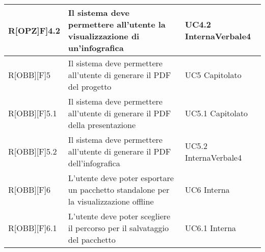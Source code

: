 \begin{table}[H]
\begin{tabular}{|p{}|p{}|p{}|}
			R[OPZ]F]4.2 & Il sistema deve permettere all'utente la visualizzazione
			di un'infografica & UC4.2 Interna\newline Verbale4\\ \midrule 
			R[OBB][F]5 & Il sistema deve permettere all'utente di generare il PDF del progetto & UC5 Capitolato\\ \midrule 
			R[OBB][F]5.1 & Il sistema deve permettere all'utente di generare il
			PDF della presentazione & UC5.1 Capitolato\\ \midrule 
			R[OBB][F]5.2 & Il sistema deve permettere all'utente di generare il
			PDF dell'infografica & UC5.2 Interna\newline Verbale4\\ \midrule 
			R[OBB][F]6 & L'utente deve poter esportare un pacchetto standalone per la visualizzazione offline & UC6 Interna\\ \midrule 
			R[OBB][F]6.1 & L'utente deve poter scegliere il percorso per il
			salvataggio del pacchetto & UC6.1 Interna\\ \midrule 
		\end{tabular}
	\end{table}
	\newpage

